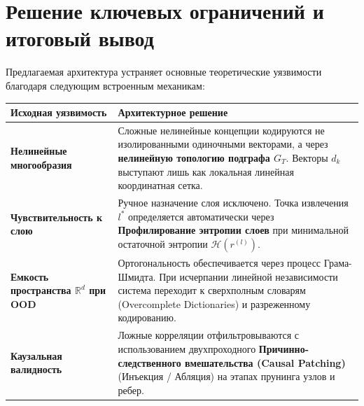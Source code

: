 \documentclass[11pt,a4paper]{article}
\begin{document}
\section{Решение ключевых ограничений и итоговый вывод}

Предлагаемая архитектура устраняет основные теоретические уязвимости благодаря следующим встроенным механикам:

\begin{table}[h!]
\centering
\begin{tabular}{p{5cm} p{10cm}}
\toprule
\textbf{Исходная уязвимость} & \textbf{Архитектурное решение} \\
\midrule
\textbf{Нелинейные многообразия} & Сложные нелинейные концепции кодируются не изолированными одиночными векторами, а через \textbf{нелинейную топологию подграфа $G_T$}. Векторы $d_k$ выступают лишь как локальная линейная координатная сетка. \\
\addlinespace
\textbf{Чувствительность к слою} & Ручное назначение слоя исключено. Точка извлечения $l^*$ определяется автоматически через \textbf{Профилирование энтропии слоев} при минимальной остаточной энтропии $\mathcal{H}(r^{(l)})$. \\
\addlinespace
\textbf{Емкость пространства $\mathbb{R}^d$ при OOD} & Ортогональность обеспечивается через процесс Грама-Шмидта. При исчерпании линейной независимости система переходит к сверхполным словарям (Overcomplete Dictionaries) и разреженному кодированию. \\
\addlinespace
\textbf{Каузальная валидность} & Ложные корреляции отфильтровываются с использованием двухпроходного \textbf{Причинно-следственного вмешательства (Causal Patching)} (Инъекция / Абляция) на этапах прунинга узлов и ребер. \\
\bottomrule
\end{tabular}
\end{table}

\end{document}
